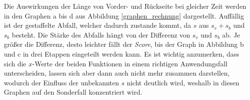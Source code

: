 Die Auswirkungen der Länge von Vorder- und Rückseite bei gleicher Zeit werden in den Graphen a bis d aus Abbildung \ref{graphen_rechnung} dargestellt. Auffällig ist der gestaffelte Abfall, welcher dadurch zustande kommt, da $s$ aus $s_v+s_b$ und $s_b$ besteht. Die Stärke des Abfalls hängt von der Differenz von $s_v$ und $s_b$ ab. Je größer die Differenz, desto leichter fällt der \textit{Score}, bis der Graph in Abbildung b und c in drei Etappen eingeteilt werden kann. Es ist wichtig anzumerken, dass sich die $x$-Werte der beiden Funktionen in einem richtigen Anwendungsfall unterscheiden, lassen sich aber dann auch nicht mehr zusammen darstellen, wodurch der Einfluss der unbekannten $s$ nicht deutlich wird, weshalb in diesen Graphen auf den Sonderfall konzentriert wird. 

\begin{figure}[H]
  \centering
    \hfill
    \hfill
\end{figure}
